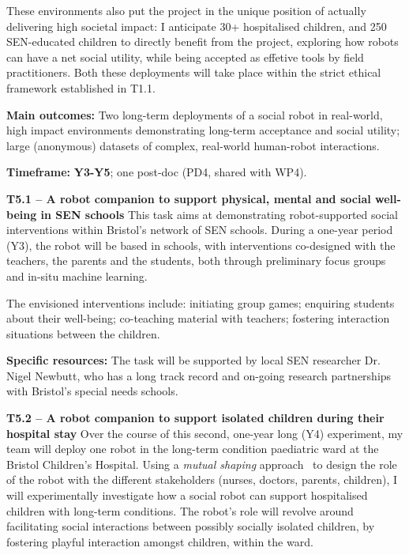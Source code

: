These environments also put the project in the unique position of actually
delivering high societal impact: I anticipate 30+ hospitalised children, and 250
SEN-educated children to directly benefit from the project, exploring how robots
can have a net social utility, while being accepted as effetive tools by field
practitioners. Both these deployments will take place within the strict ethical
framework established in T1.1.

\begin{oframed}

    \textbf{Main outcomes:} Two long-term deployments of a social robot in
    real-world, high impact environments demonstrating long-term acceptance and
    social utility; large (anonymous) datasets of complex, real-world
    human-robot interactions.

    \textbf{Timeframe:} \textbf{Y3-Y5}; one post-doc (PD4, shared with WP4).

\end{oframed}

\textbf{T5.1 -- A robot companion to support physical, mental and social
well-being in SEN schools} This task aims at demonstrating robot-supported
social interventions within Bristol's network of SEN schools.  During a one-year
period (Y3), the robot will be based in schools, with interventions co-designed
with the teachers, the parents and the students, both through preliminary
focus groups and in-situ machine learning.

The envisioned interventions include: initiating group games; enquiring students
about their well-being; co-teaching material with teachers; fostering
interaction situations between the children.

\textbf{Specific resources:} The task will be supported by local SEN researcher
Dr. Nigel Newbutt, who has a long track record and on-going research
partnerships with Bristol's special needs schools.


\textbf{T5.2 -- A robot companion to support isolated children during their
hospital stay} Over the course of this second, one-year long (Y4)
experiment, my team will deploy one \project robot in the long-term condition
paediatric ward at the Bristol Children's Hospital.  Using a \emph{mutual shaping}
approach~\cite{winkle2018social} to design the role of the robot with the
different stakeholders (nurses, doctors, parents, children), I will
experimentally investigate how a social robot can support hospitalised children
with long-term conditions. The robot's role will revolve around facilitating
social interactions between possibly socially isolated children, by fostering
playful interaction amongst children, within the ward.


